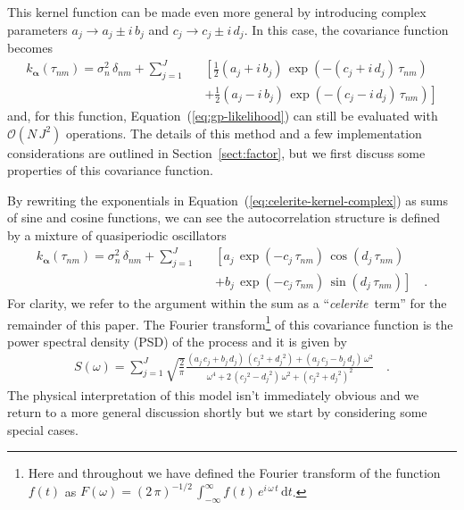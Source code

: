 \documentclass[manuscript, letterpaper]{aastex6}
\newcommand{\celeriteterm}{\emph{celerite}}
\renewcommand{\eqref}[1]{\ref{eq:#1}}
\newcommand{\Eq}[1]{Equation~(\eqref{#1})}
\newcommand{\eq}[1]{\Eq{#1}}
\newcommand{\eqlabel}[1]{\label{eq:#1}}
\newcommand{\sectionname}{Section}
\newcommand{\sectref}[1]{\ref{sect:#1}}
\newcommand{\Sect}[1]{\sectionname~\sectref{#1}}
\newcommand{\sect}[1]{\Sect{#1}}
\newcommand{\dd}{\ensuremath{\,\mathrm{d}}}
\newcommand{\bvec}[1]{{\ensuremath{\boldsymbol{#1}}}}
\begin{document}
This kernel function can be made even more general by
introducing complex parameters $a_j \to a_j\pm i\,b_j$ and
$c_j \to c_j\pm i\,d_j$.
In this case, the covariance function becomes
\begin{eqnarray}\eqlabel{celerite-kernel-complex}
    k_\bvec{\alpha}(\tau_{nm}) = \sigma_n^2\,\delta_{nm} +
    \sum_{j=1}^J &&\left[
        \frac{1}{2}(a_j + i\,b_j)\,\exp\left(-(c_j+i\,d_j)\,\tau_{nm}\right)
        \right. \nonumber\\
        &&+\left.
        \frac{1}{2}(a_j - i\,b_j)\,\exp\left(-(c_j-i\,d_j)\,\tau_{nm}\right)
        \right]
\end{eqnarray}
and, for this function, \eq{gp-likelihood} can still be evaluated with
$\mathcal{O}(N\,J^2)$ operations.
The details of this method and a few implementation considerations are
outlined in \sect{factor}, but we first discuss some properties of this
covariance function.

By rewriting the exponentials in \eq{celerite-kernel-complex} as sums of sine
and cosine functions, we can see the autocorrelation structure is defined by a
mixture of quasiperiodic oscillators
\begin{eqnarray}\eqlabel{celerite-kernel}
    k_\bvec{\alpha}(\tau_{nm}) = \sigma_n^2\,\delta_{nm} +
    \sum_{j=1}^J &&\left[
        a_j\,\exp\left(-c_j\,\tau_{nm}\right)\,\cos\left(d_j\,\tau_{nm}\right)
        \right.\nonumber\\
        &&+ \left.
        b_j\,\exp\left(-c_j\,\tau_{nm}\right)\,\sin\left(d_j\,\tau_{nm}\right)
        \right] \quad.
\end{eqnarray}
For clarity, we refer to the argument within the sum as a ``\celeriteterm\
term'' for the remainder of this paper.
The Fourier transform\footnote{Here and throughout we have defined the Fourier
transform of the function $f(t)$ as $F(\omega)={(2\,\pi)}^{-1/2}\,
    \int_{-\infty}^\infty f(t)\,e^{i\,\omega\,t}\dd t$.} of this covariance
function is the power spectral density (PSD) of the process and it is given by
\begin{eqnarray}\eqlabel{celerite-psd}
    S(\omega) = \sum_{j=1}^J \sqrt{\frac{2}{\pi}}
    \frac{(a_j\,c_j+b_j\,d_j)\,({c_j}^2+{d_j}^2)+(a_j\,c_j-b_j\,d_j)\,\omega^2}
    {\omega^4+2\,({c_j}^2-{d_j}^2)\,\omega^2+{({c_j}^2+{d_j}^2)}^2}\quad.
\end{eqnarray}
The physical interpretation of this model isn't immediately obvious and we
return to a more general discussion shortly but we start by considering some
special cases.
\end{document}
